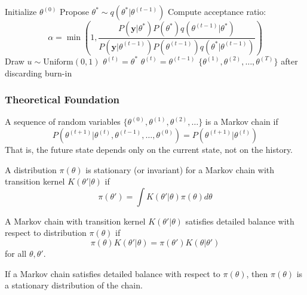 \begin{algorithmbox}
\begin{algorithm}[H]
\caption{Metropolis-Hastings MCMC}
\begin{algorithmic}[1]
\State Initialize $\theta^{(0)}$
    \State Propose $\theta^* \sim q(\theta^*|\theta^{(t-1)})$ 
    \State Compute acceptance ratio:
    $$\alpha = \min\left(1, \frac{P(\mathbf{y}|\theta^*) P(\theta^*) q(\theta^{(t-1)}|\theta^*)}{P(\mathbf{y}|\theta^{(t-1)}) P(\theta^{(t-1)}) q(\theta^*|\theta^{(t-1)})}\right)$$
    \State Draw $u \sim \text{Uniform}(0,1)$
        \State $\theta^{(t)} = \theta^*$ 
    \Else
        \State $\theta^{(t)} = \theta^{(t-1)}$ 
    \EndIf
\EndFor
\State \Return $\{\theta^{(1)}, \theta^{(2)}, \dots, \theta^{(T)}\}$ after discarding burn-in
\end{algorithmic}
\end{algorithm}
\end{algorithmbox}

\subsubsection*{Theoretical Foundation}
\begin{definition}
A sequence of random variables $\{\theta^{(0)}, \theta^{(1)}, \theta^{(2)}, \dots\}$ is a Markov chain if
$$P(\theta^{(t+1)} | \theta^{(t)}, \theta^{(t-1)}, \dots, \theta^{(0)}) = P(\theta^{(t+1)} | \theta^{(t)})$$
That is, the future state depends only on the current state, not on the history.
\end{definition}

\begin{definition}
A distribution $\pi(\theta)$ is stationary (or invariant) for a Markov chain with transition kernel $K(\theta'|\theta)$ if
$$\pi(\theta') = \int K(\theta'|\theta) \pi(\theta) d\theta$$
\end{definition}

\begin{definition}
A Markov chain with transition kernel $K(\theta'|\theta)$ satisfies detailed balance with respect to distribution $\pi(\theta)$ if
$$\pi(\theta) K(\theta'|\theta) = \pi(\theta') K(\theta|\theta')$$
for all $\theta, \theta'$.
\end{definition}

\begin{theorem}
If a Markov chain satisfies detailed balance with respect to $\pi(\theta)$, then $\pi(\theta)$ is a stationary distribution of the chain.
\end{theorem}


